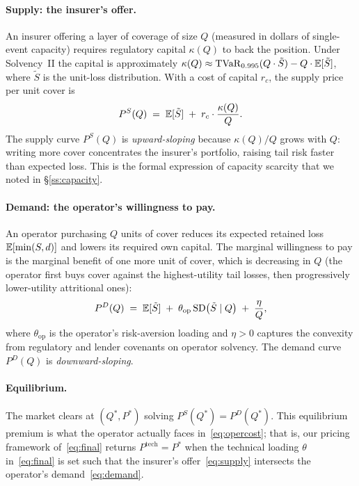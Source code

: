 \paragraph{Supply: the insurer's offer.} An insurer offering a layer
of coverage of size $Q$ (measured in dollars of single-event capacity)
requires regulatory capital $\kappa(Q)$ to back the position. Under
Solvency~II the capital is approximately
$\kappa(Q)\approx\operatorname{TVaR}_{0.995}(Q\cdot \tilde S) - Q\cdot\mathbb{E}[\tilde S]$,
where $\tilde S$ is the unit-loss distribution. With a cost of capital
$r_c$, the supply price per unit cover is
\begin{equation}\label{eq:supply}
   P^S(Q) \;=\; \mathbb{E}[\tilde S]
   \;+\; r_c\cdot\frac{\kappa(Q)}{Q}.
\end{equation}
The supply curve $P^S(Q)$ is \emph{upward-sloping} because
$\kappa(Q)/Q$ grows with $Q$: writing more cover concentrates the
insurer's portfolio, raising tail risk faster than expected loss.
This is the formal expression of capacity scarcity that we noted in
\S\ref{ss:capacity}.

\paragraph{Demand: the operator's willingness to pay.} An operator
purchasing $Q$ units of cover reduces its expected retained loss
$\mathbb{E}[\min(S,d)]$ and lowers its required own capital. The marginal
willingness to pay is the marginal benefit of one more unit of cover,
which is decreasing in $Q$ (the operator first buys cover against
the highest-utility tail losses, then progressively lower-utility
attritional ones):
\begin{equation}\label{eq:demand}
   P^D(Q) \;=\; \mathbb{E}[\tilde S]
   \;+\; \theta_{\mathrm{op}}\,\mathrm{SD}\bigl(\tilde S \mid Q\bigr)
   \;+\; \frac{\eta}{Q},
\end{equation}
where $\theta_{\mathrm{op}}$ is the operator's risk-aversion loading
and $\eta>0$ captures the convexity from regulatory and lender
covenants on operator solvency. The demand curve $P^D(Q)$ is
\emph{downward-sloping}.

\paragraph{Equilibrium.} The market clears at $(Q^*,P^*)$ solving
$P^S(Q^*)=P^D(Q^*)$. This equilibrium premium is what the operator
actually faces in~\eqref{eq:opercost}; that is, our pricing framework
of~\eqref{eq:final} returns $P^{\mathrm{tech}}=P^*$ when the technical
loading $\theta$ in~\eqref{eq:final} is set such that the insurer's
offer~\eqref{eq:supply} intersects the operator's
demand~\eqref{eq:demand}.

